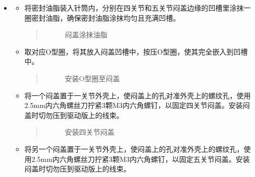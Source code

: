 \documentclass[a4paper,11pt,english,openany,oneside]{sphinxmanual}
\begin{document}
\begin{itemize}
\begin{itemize}
\item {} 
\sphinxAtStartPar
整理线束并使用扎带将线束成组固定，使用斜口钳将多余扎带齐根剪掉，注意剪扎带时切勿剪到线束。

\end{itemize}

\item {} 
\sphinxAtStartPar
{}
\begin{itemize}
\item {} 
\sphinxAtStartPar
将密封油脂装入针筒内，分别在四关节和五关节闷盖边缘的凹槽里涂抹一圈密封油脂，确保密封油脂涂抹均匀且充满凹槽。
\begin{quote}

\begin{figure}[H]
\centering
\capstart

\noindent{}
\caption{闷盖涂抹油脂}\label{\detokenize{_u66f4_u6362_u5173_u8282:id97}}\end{figure}
\end{quote}

\item {} 
\sphinxAtStartPar
取对应O型圈，将其放入闷盖凹槽中，按压O型圈，使其完全嵌入到凹槽中。
\begin{quote}

\begin{figure}[H]
\centering
\capstart

\noindent{}
\caption{安装O型圈至闷盖}\label{\detokenize{_u66f4_u6362_u5173_u8282:id98}}\end{figure}
\end{quote}

\item {} 
\sphinxAtStartPar
将一个闷盖置于一关节外壳上，使闷盖上的孔对准外壳上的螺纹孔，使用2.5mm内六角螺丝刀拧紧3颗M3内六角螺钉，以固定四关节闷盖。安装闷盖时切勿压到驱动版上的线束。
\begin{quote}

\begin{figure}[H]
\centering
\capstart

\noindent{}
\caption{安装四关节闷盖}\label{\detokenize{_u66f4_u6362_u5173_u8282:id99}}\end{figure}
\end{quote}

\item {} 
\sphinxAtStartPar
将另一个闷盖置于一关节外壳上，使闷盖上的孔对准外壳上的螺纹孔，使用2.5mm内六角螺丝刀拧紧3颗M3内六角螺钉，以固定五关节闷盖。安装闷盖时切勿压到驱动版上的线束。
\begin{quote}


\end{quote}
\end{itemize}
\end{itemize}
\end{document}

